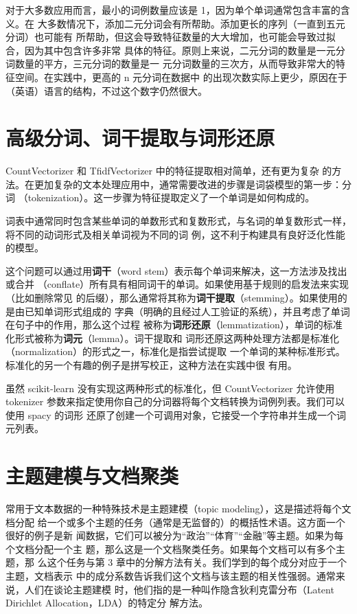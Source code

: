 对于大多数应用而言，最小的词例数量应该是 1，因为单个单词通常包含丰富的含义。在
大多数情况下，添加二元分词会有所帮助。添加更长的序列（一直到五元分词）也可能有
所帮助，但这会导致特征数量的大大增加，也可能会导致过拟合，因为其中包含许多非常
具体的特征。原则上来说，二元分词的数量是一元分词数量的平方，三元分词的数量是一
元分词数量的三次方，从而导致非常大的特征空间。在实践中，更高的 n 元分词在数据中
的出现次数实际上更少，原因在于（英语）语言的结构，不过这个数字仍然很大。
\section{高级分词、词干提取与词形还原}
CountVectorizer 和 TfidfVectorizer 中的特征提取相对简单，还有更为复杂
的方法。在更加复杂的文本处理应用中，通常需要改进的步骤是词袋模型的第一步：分词
（tokenization）。这一步骤为特征提取定义了一个单词是如何构成的。

词表中通常同时包含某些单词的单数形式和复数形式，与名词的单复数形式一样，将不同的动词形式及相关单词视为不同的词
例，这不利于构建具有良好泛化性能的模型。

这个问题可以通过用\textbf{词干}（word stem）表示每个单词来解决，这一方法涉及找出或合并
（conflate）所有具有相同词干的单词。如果使用基于规则的启发法来实现（比如删除常见
的后缀），那么通常将其称为\textbf{词干提取}（stemming）。如果使用的是由已知单词形式组成的
字典（明确的且经过人工验证的系统），并且考虑了单词在句子中的作用，那么这个过程
被称为\textbf{词形还原}（lemmatization），单词的标准化形式被称为\textbf{词元}（lemma）。词干提取和
词形还原这两种处理方法都是标准化（normalization）的形式之一，标准化是指尝试提取
一个单词的某种标准形式。标准化的另一个有趣的例子是拼写校正，这种方法在实践中很
有用。

虽然 scikit-learn 没有实现这两种形式的标准化，但 CountVectorizer 允许使用 tokenizer
参数来指定使用你自己的分词器将每个文档转换为词例列表。我们可以使用 spacy 的词形
还原了创建一个可调用对象，它接受一个字符串并生成一个词元列表。

\section{主题建模与文档聚类}
常用于文本数据的一种特殊技术是主题建模（topic modeling），这是描述将每个文档分配
给一个或多个主题的任务（通常是无监督的）的概括性术语。这方面一个很好的例子是新
闻数据，它们可以被分为“政治”“体育”“金融”等主题。如果为每个文档分配一个主
题，那么这是一个文档聚类任务。如果每个文档可以有多个主题，那
么这个任务与第 3 章中的分解方法有关。我们学到的每个成分对应于一个主题，文档表示
中的成分系数告诉我们这个文档与该主题的相关性强弱。通常来说，人们在谈论主题建模
时，他们指的是一种叫作隐含狄利克雷分布（Latent Dirichlet Allocation，LDA）的特定分
解方法。
